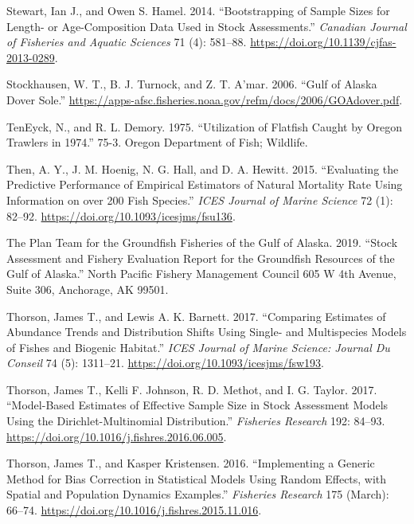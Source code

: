 \documentclass[11pt,
  english,
  a4paper,
]{article}
\begin{document}
\begin{cslreferences}
\leavevmode\hypertarget{ref-stewart_bootstrapping_2014}{}%
Stewart, Ian J., and Owen S. Hamel. 2014. ``Bootstrapping of Sample Sizes for Length- or Age-Composition Data Used in Stock Assessments.'' \emph{Canadian Journal of Fisheries and Aquatic Sciences} 71 (4): 581--88. \url{https://doi.org/10.1139/cjfas-2013-0289}.

\leavevmode\hypertarget{ref-stockhausen_gulf_2006}{}%
Stockhausen, W. T., B. J. Turnock, and Z. T. A'mar. 2006. ``Gulf of Alaska Dover Sole.'' \url{https://apps-afsc.fisheries.noaa.gov/refm/docs/2006/GOAdover.pdf}.

\leavevmode\hypertarget{ref-teneyck_utilization_1975}{}%
TenEyck, N., and R. L. Demory. 1975. ``Utilization of Flatfish Caught by Oregon Trawlers in 1974.'' 75-3. Oregon Department of Fish; Wildlife.

\leavevmode\hypertarget{ref-then_evaluating_2015}{}%
Then, A. Y., J. M. Hoenig, N. G. Hall, and D. A. Hewitt. 2015. ``Evaluating the Predictive Performance of Empirical Estimators of Natural Mortality Rate Using Information on over 200 Fish Species.'' \emph{ICES Journal of Marine Science} 72 (1): 82--92. \url{https://doi.org/10.1093/icesjms/fsu136}.

\leavevmode\hypertarget{ref-the_plan_team_for_the_groundfish_fisheries_of_the_gulf_of_alaska_stock_2019}{}%
The Plan Team for the Groundfish Fisheries of the Gulf of Alaska. 2019. ``Stock Assessment and Fishery Evaluation Report for the Groundfish Resources of the Gulf of Alaska.'' North Pacific Fishery Management Council 605 W 4th Avenue, Suite 306, Anchorage, AK 99501.

\leavevmode\hypertarget{ref-thorson_comparing_2017}{}%
Thorson, James T., and Lewis A. K. Barnett. 2017. ``Comparing Estimates of Abundance Trends and Distribution Shifts Using Single- and Multispecies Models of Fishes and Biogenic Habitat.'' \emph{ICES Journal of Marine Science: Journal Du Conseil} 74 (5): 1311--21. \url{https://doi.org/10.1093/icesjms/fsw193}.

\leavevmode\hypertarget{ref-thorson_model-based_2017}{}%
Thorson, James T., Kelli F. Johnson, R. D. Methot, and I. G. Taylor. 2017. ``Model-Based Estimates of Effective Sample Size in Stock Assessment Models Using the Dirichlet-Multinomial Distribution.'' \emph{Fisheries Research} 192: 84--93. \url{https://doi.org/10.1016/j.fishres.2016.06.005}.

\leavevmode\hypertarget{ref-thorson_implementing_2016}{}%
Thorson, James T., and Kasper Kristensen. 2016. ``Implementing a Generic Method for Bias Correction in Statistical Models Using Random Effects, with Spatial and Population Dynamics Examples.'' \emph{Fisheries Research} 175 (March): 66--74. \url{https://doi.org/10.1016/j.fishres.2015.11.016}.


\end{cslreferences}
\end{document}

